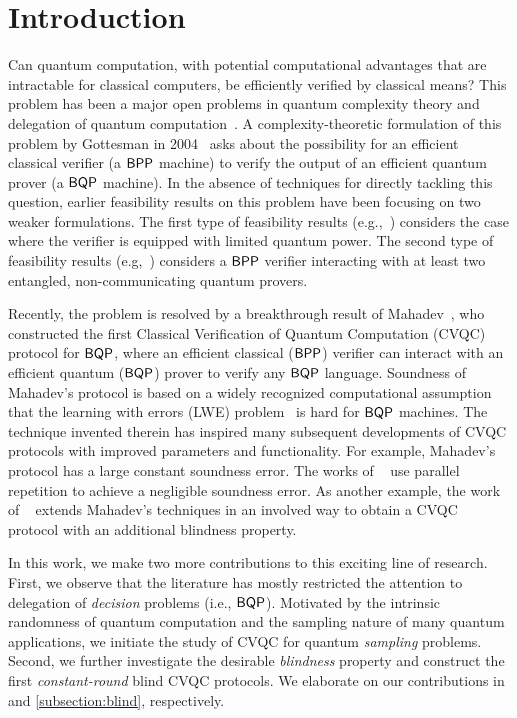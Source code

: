 \section{Introduction}

Can quantum computation, with potential computational advantages that are intractable for classical computers,
be efficiently verified by classical means?
This problem has been a major open problems in quantum complexity theory and delegation of quantum computation~\cite{web:Aaronson}. A complexity-theoretic formulation of this problem by Gottesman in 2004~\cite{web:Aaronson} asks about the possibility for an efficient classical verifier (a $\operatorname{\mathsf{BPP}}$ machine) to verify the output of an
efficient quantum prover (a $\operatorname{\mathsf{BQP}}$ machine).
In the absence of techniques for directly tackling this question, earlier feasibility results on this problem have been focusing on two weaker formulations.
The first type of feasibility results (e.g.,~\cite{BFK09,arXiv:ABOEM17,FK17,mf16}) considers the case where the verifier is equipped with limited quantum power.
The second type of feasibility results (e.g,~\cite{Nat:RUV13, CGJV19, Gheorghiu_2015, HPF15})
considers a $\operatorname{\mathsf{BPP}}$ verifier interacting with at least two entangled, non-communicating quantum provers.

Recently, the problem is resolved by a breakthrough result of Mahadev~\cite{FOCS:Mahadev18a}, who constructed the first Classical Verification of Quantum Computation (CVQC) protocol for $\operatorname{\mathsf{BQP}}$, where an efficient classical ($\operatorname{\mathsf{BPP}}$) verifier can interact with an efficient quantum ($\operatorname{\mathsf{BQP}}$) prover to verify any $\operatorname{\mathsf{BQP}}$ language. Soundness of Mahadev's protocol  is based on a widely recognized computational assumption that the learning with errors (LWE) problem~\cite{JACM:Regev09} is hard for $\operatorname{\mathsf{BQP}}$ machines.
The technique invented therein has inspired many subsequent developments of CVQC protocols with improved parameters and functionality. For example, Mahadev's protocol has a large constant soundness error. The works of ~\cite{arXiv:AlaChiHun19,arXiv:ChiaChungYam19} use parallel repetition to achieve a negligible soundness error. As another example, the work of ~\cite{FOCS:GheVid19} extends Mahadev's techniques in an involved way to obtain a CVQC protocol with an additional blindness property.  

In this work, we make two more contributions to this exciting line of research. First, we observe that the literature has mostly restricted the attention to delegation of \emph{decision} problems (i.e., $\operatorname{\mathsf{BQP}}$). Motivated by the intrinsic randomness of quantum computation and the sampling nature of many quantum applications, we initiate the study of CVQC for quantum \emph{sampling} problems. Second, we further investigate the desirable \emph{blindness} property and construct the first \emph{constant-round} blind CVQC protocols. We elaborate on our contributions in  and \ref{subsection:blind}, respectively.

